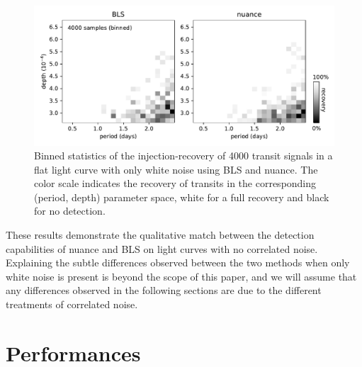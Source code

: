 \documentclass[modern]{aastex631}
\newcommand{\nuancecode}{\textsf{nuance}}
\begin{document}
\begin{figure}[H]
    \begin{centering}
        \includegraphics[width=\linewidth]{../workflows/control_test_bls/figures/control_test.pdf}
        \caption{Binned statistics of the injection-recovery of 4000 transit signals in a flat light curve with only white noise using BLS and \nuancecode{}. The color scale indicates the recovery of transits in the corresponding (period, depth) parameter space, white for a full recovery and black for no detection.}
        \label{fig:control}
    \end{centering}
\end{figure}

These results demonstrate the qualitative match between the detection capabilities of \textsf{nuance} and BLS on light curves with no correlated noise. Explaining the subtle differences observed between the two methods when only white noise is present is beyond the scope of this paper, and we will assume that any differences observed in the following sections are due to the different treatments of correlated noise.

\newpage
\section{Performances}\label{results}
\end{document}
